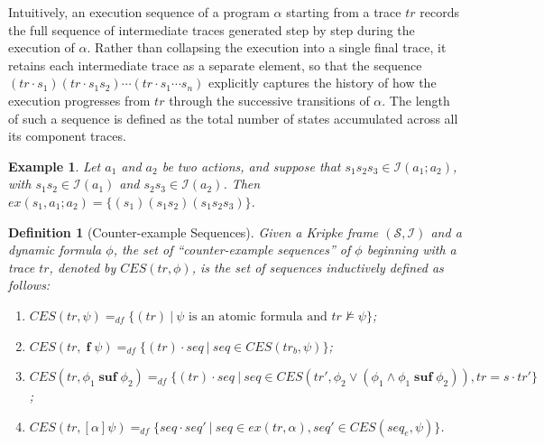 \documentclass[manuscript,screen]{acmart}
\newtheorem{definition}{Definition}[section]
\newtheorem{example}{Example}[section]
\newcommand{\mcl}[1]{\mathcal{#1}}
\newcommand{\dddef}[0]{=_{df}}
\DeclareMathOperator{\seq}{;}
\newcommand{\EX}[0]{\textit{CES}}
\newcommand{\EXA}[0]{\textit{ES}}
\newcommand{\ex}[0]{\textit{ex}}
\newcommand{\Wd}[0]{\mcl{S}}
\newcommand{\I}[0]{\mcl{I}}
\DeclareMathOperator{\ofst}{\mathbf{f}}
\DeclareMathOperator{\osuf}{\mathbf{suf}}
\begin{document}
Intuitively, an execution sequence of a program $\alpha$ starting from a trace $tr$ records the full sequence of intermediate traces generated step by step during the execution of $\alpha$.  Rather than collapsing the execution into a single final trace, it retains each intermediate trace as a separate element, so that the sequence $(tr\cdot s_1)(tr\cdot s_1s_2)\cdots(tr\cdot s_1\cdots s_n)$ explicitly captures the history of how the execution progresses from $tr$ through the successive transitions of $\alpha$.  The length of such a sequence is defined as the total number of states accumulated across all its component traces.

\begin{example}
    \label{ex:execution sequences}
Let $a_1$ and $a_2$ be two actions, and suppose that $s_1s_2s_3\in \I(a_1\seq a_2)$, with $s_1s_2\in \I(a_1)$ and $s_2s_3\in \I(a_2)$. Then $\ex(s_1, a_1\seq a_2) = \{(s_1)(s_1s_2)(s_1s_2s_3)\}$. 
\end{example}

\ifx
\begin{definition}[Counter-example Sequences]
    \label{def:Minimum Counter-example Traces}
    Given a Kripke frame $(\Wd, \I)$ and a dynamic formula $\phi$, the set of ``counter-example sequences'' of $\phi$ beginning with a trace $tr$, denoted by $\EX(tr, \phi)$, is the set of sequences inductively defined as follows:
    \begin{enumerate}
        \item $\EX(tr, \psi)\dddef \{(tr)\ |\ \mbox{$\psi$ is an atomic formula and $tr\not\models \psi$}\}$; 
        \item $\EX(tr, \ofst\psi)\dddef \{(tr)\cdot seq\ |\ seq\in \EX(tr_b, \psi)\}$;
        \item $\EX(tr, \phi_1\osuf \phi_2)\dddef \{(tr)\cdot seq\ |\ seq\in \EX(tr', \phi_2\vee (\phi_1\wedge \phi_1\osuf\phi_2)), tr = s\cdot tr'\}$;
        \item $\EX(tr, [\alpha]\psi)\dddef \{seq\cdot seq'\ |\ seq\in \ex(tr, \alpha), seq'\in \EX(seq_e, \psi)\}$.
    \end{enumerate}
\end{definition}
\fi
\end{document}
